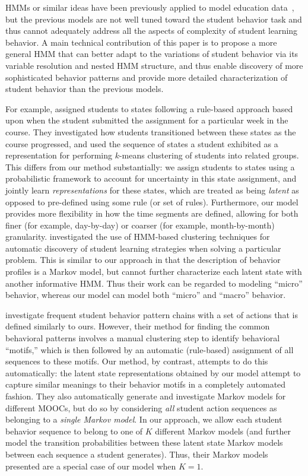 HMMs or similar ideas have been previously applied to model education
data~\cite{Shih:2010:EDM,Kizilcec:2013:LAK,Davis:2016:EDM}, but the
previous models are not well tuned toward the student behavior task and
thus cannot adequately address all the aspects of complexity of student
learning behavior.  A main technical contribution of this paper is to
propose a more general HMM that can better adapt to the variations of
student behavior via its variable resolution and nested HMM structure, and
thus enable discovery of more sophisticated behavior patterns and provide
more detailed characterization of student behavior than the previous
models.

For example, \citet{Kizilcec:2013:LAK} assigned students to states
following a rule-based approach based upon when the student submitted the
assignment for a particular week in the course. They investigated how
students transitioned between these states as the course progressed, and
used the sequence of states a student exhibited as a representation for
performing $k$-means clustering of students into related groups. This
differs from our method substantially: we assign students to states using a
probabilistic framework to account for uncertainty in this state
assignment, and jointly learn \emph{representations} for these states,
which are treated as being \emph{latent} as opposed to pre-defined using
some rule (or set of rules).  Furthermore, our model provides more
flexibility in how the time segments are defined, allowing for both finer
(for example, day-by-day) or coarser (for example, month-by-month)
granularity. \citet{Shih:2010:EDM} investigated the use of HMM-based
clustering techniques for automatic discovery of student learning
strategies when solving a particular problem.  This is similar to our
approach in that the description of behavior profiles is a Markov model,
but cannot further characterize each latent state with another informative
HMM. Thus their work can be regarded to modeling ``micro'' behavior,
whereas our model can model both ``micro'' and ``macro'' behavior.

\citet{Davis:2016:EDM} investigate frequent student behavior pattern chains
with a set of actions that is defined similarly to ours. However, their
method for finding the common behavioral patterns involves a manual
clustering step to identify behavioral ``motifs,'' which is then followed
by an automatic (rule-based) assignment of all sequences to these motifs.
Our method, by contrast, attempts to do this automatically: the latent
state representations obtained by our model attempt to capture similar
meanings to their behavior motifs in a completely automated fashion. They
also automatically generate and investigate Markov models for different
MOOCs, but do so by considering \emph{all} student action sequences as
belonging to a \emph{single Markov model}. In our approach, we allow each
student behavior sequence to belong to one of $K$ different Markov models
(and further model the transition probabilities between these latent state
Markov models between each sequence a student generates). Thus, their
Markov models presented are a special case of our model when $K = 1$.

